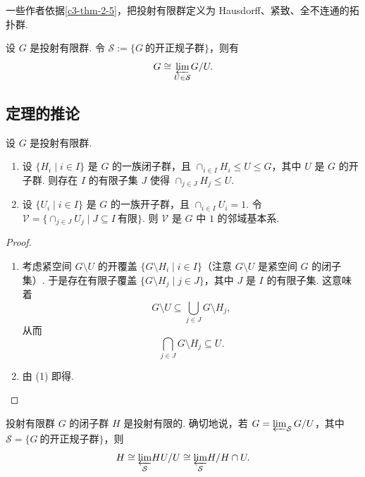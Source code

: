 \begin{remark}\label{c3-rem-2-1}
一些作者依据\autoref{c3-thm-2-5}，把投射有限群定义为 Hausdorff、紧致、全不连通的拓扑群.
\end{remark}

\begin{corollary}\label{c3-cor-2-6}
设 $G$ 是投射有限群. 令 $\mathcal{S}:=\{G\ \text{的开正规子群}\}$，则有
\[
G\cong{\varprojlim_{U\in\mathcal{S}}}G/U.
\]
\end{corollary}

\subsection{定理的推论}

\begin{proposition}\label{c3-prop-2-7}
设 $G$ 是投射有限群.
\begin{enumerate}[label=(\arabic*),leftmargin=*]
    \item 设 $\{H_i\mid i\in I\}$ 是 $G$ 的一族闭子群，且 $\cap_{i\in I}H_i\leq U\leq G$，其中 $U$ 是 $G$ 的开子群. 则存在 $I$ 的有限子集 $J$ 使得 $\cap_{j\in J}H_j\leq U$.
    \item 设 $\{U_i\mid i\in I\}$ 是 $G$ 的一族开子群，且 $\cap_{i\in I}U_i=1$. 令 $\mathcal{V}=\{\cap_{j\in J}U_j\mid J\subseteq I\ \text{有限}\}$. 则 $\mathcal{V}$ 是 $G$ 中 $1$ 的邻域基本系.
\end{enumerate}
\end{proposition}

\begin{proof}\
\begin{enumerate}[label=(\arabic*),leftmargin=*]
    \item 考虑紧空间 $G\setminus U$ 的开覆盖 $\{G\setminus H_i\mid i\in I\}$（注意 $G\setminus U$ 是紧空间 $G$ 的闭子集）. 于是存在有限子覆盖 $\{G\setminus H_j\mid j\in J\}$，其中 $J$ 是 $I$ 的有限子集. 这意味着
    \[
    G\setminus U\subseteq\bigcup_{j\in J}G\setminus H_j,
    \]
    从而
    \[
    \bigcap_{j\in J}G\setminus H_j\subseteq U.
    \]
    \item 由 (1) 即得.
\end{enumerate}
\end{proof}

\begin{proposition}\label{c3-prop-2-8}
投射有限群 $G$ 的闭子群 $H$ 是投射有限的. 确切地说，若 $G=\varprojlim_{\mathcal{S}}G/U$，其中 $\mathcal{S}=\{G\ \text{的开正规子群}\}$，则
\[
H\cong{\varprojlim_{\mathcal{S}}}HU/U\cong{\varprojlim_{\mathcal{S}}}H/H\cap U.
\]
\end{proposition}

